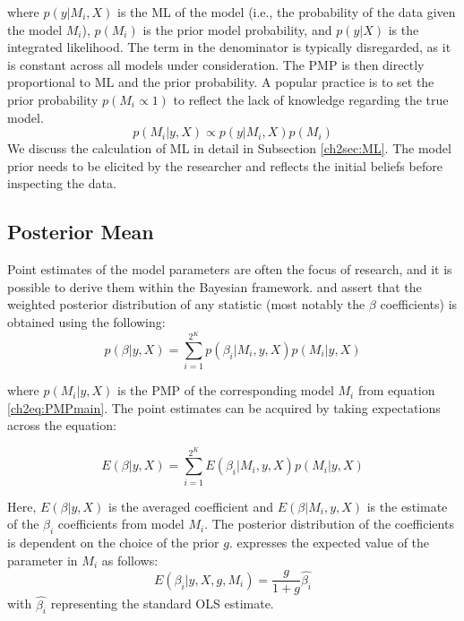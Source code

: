 \begin{refsection}
where $p(y\vert M_{i},X)$ is the \ac{ML} of the model (i.e., the probability of the data given the model $M_{i}$), $p(M_{i})$ is the prior model probability, and $p(y\vert X)$ is the integrated likelihood. The term in the denominator is typically disregarded, as it is constant across all models under consideration. The PMP is then directly proportional to \ac{ML} and the prior probability. A popular practice is to set the prior probability $p(M_{i} \propto 1)$ to reflect the lack of knowledge regarding the true model.
\begin{equation}
	p(M_{i}\vert y,X) \propto p(y\vert M_{i},X)p(M_{i})
\end{equation}
%
We discuss the calculation of \ac{ML} in detail in Subsection \ref{ch2sec:ML}. The model prior needs to be elicited by the researcher and reflects the initial beliefs before inspecting the data. 
%
\subsection{Posterior Mean}
Point estimates of the model parameters are often the focus of research, and it is possible to derive them within the Bayesian framework. \textcite{Zeugner2011} and \textcite{MoralBenito2012} assert that the weighted posterior distribution of any statistic (most notably the $\beta$ coefficients) is obtained using the following:
%
\begin{equation}\label{ch2eq:parest}
	p(\beta \vert y, X) = \sum_{i=1}^{2^{K}} p(\beta_{i} \vert M_{i},y,X)p(M_{i} \vert y,X)
\end{equation}

where $p(M_{i} \vert y, X)$ is the \ac{PMP} of the corresponding model $M_{i}$ from equation \ref{ch2eq:PMPmain}. The point estimates can be acquired by taking expectations across the equation:

\begin{equation}\label{ch2eq:pointparest}
	E(\beta \vert y, X) = \sum_{i=1}^{2^{K}} E(\beta_{i} \vert M_{i},y,X)p(M_{i} \vert y,X)
\end{equation}

Here, $E(\beta \vert y, X)$ is the averaged coefficient and $E(\beta \vert M_{i},y,X)$ is the estimate of the $\beta_{i}$ coefficients from model $M_{i}$. The posterior distribution of the coefficients is dependent on the choice of the prior $g$. \textcite{Zeugner2011} expresses the expected value of the parameter in $M_{i}$ as follows:
\begin{equation}\label{ch2eq:postdist}
	E(\beta_{i} \vert y,X,g,M_{i}) = \frac{g}{1+g}\hat{\beta_{i}}
\end{equation}
with $\hat{\beta_{i}}$ representing the standard \ac{OLS} estimate.


\end{refsection}
